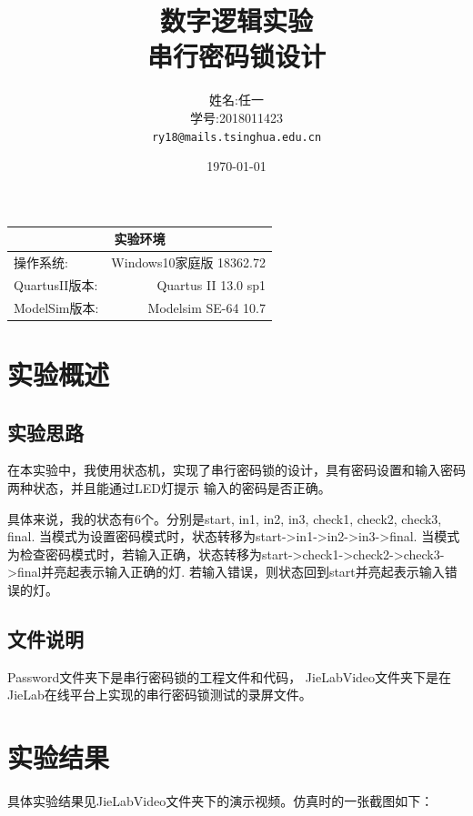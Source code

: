 \documentclass[UTF8]{article}
\title{数字逻辑实验 \\ 串行密码锁设计} %
\author{姓名:任一  \\学号:2018011423\\ \texttt{ry18@mails.tsinghua.edu.cn}} %
\date{\today} %
\begin{document}
\maketitle %
\begin{center}
    \begin{tabular}{l  r}
    \hline

        \multicolumn{2}{c}{实验环境} \\ \hline
        操作系统: & Windows10家庭版 18362.72 \\ \hline%
        QuartusII版本: & Quartus II 13.0 sp1 \\ \hline%

        ModelSim版本: & Modelsim SE-64 10.7 \\ \hline%

    \end{tabular}
\end{center}
\newpage


\section{实验概述}
\subsection{实验思路}
在本实验中，我使用状态机，实现了串行密码锁的设计，具有密码设置和输入密码两种状态，并且能通过LED灯提示
输入的密码是否正确。

具体来说，我的状态有6个。分别是start, in1, in2, in3, check1, check2, check3, final.
当模式为设置密码模式时，状态转移为start->in1->in2->in3->final.
当模式为检查密码模式时，若输入正确，状态转移为start->check1->check2->check3->final并亮起表示输入正确的灯.
若输入错误，则状态回到start并亮起表示输入错误的灯。

\subsection{文件说明}
Password文件夹下是串行密码锁的工程文件和代码，
JieLabVideo文件夹下是在JieLab在线平台上实现的串行密码锁测试的录屏文件。


\section{实验结果}
具体实验结果见JieLabVideo文件夹下的演示视频。仿真时的一张截图如下：
\end{document}
